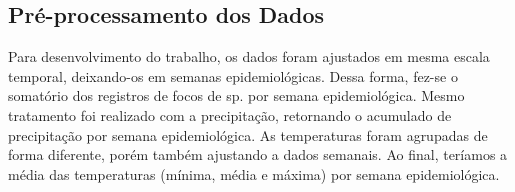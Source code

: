



\subsection{Pré-processamento dos Dados}
\indent Para desenvolvimento do trabalho, os dados foram ajustados em mesma escala temporal, deixando-os em semanas epidemiológicas. Dessa forma, fez-se o somatório dos registros de focos de  sp. por semana epidemiológica. Mesmo tratamento foi realizado com a precipitação, retornando o acumulado de precipitação por semana epidemiológica. As temperaturas foram agrupadas de forma diferente, porém também ajustando a dados semanais. Ao final, teríamos a média das temperaturas (mínima, média e máxima) por semana epidemiológica.\\


